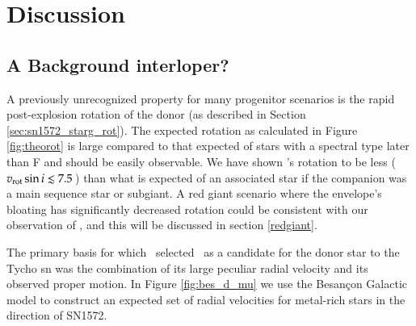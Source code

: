 \section{Discussion}


\subsection{A Background interloper?}
\label{sec:sn1572:interloper}
A previously unrecognized property for many progenitor scenarios is the rapid post-explosion rotation of the donor (as described in Section \ref{sec:sn1572_starg_rot}).
The expected rotation as calculated in Figure \ref{fig:theorot} is
large compared to that expected of stars with a spectral type later
than F and should be easily observable. We have shown \starg's rotation to be less ($v_{\rm rot} \sin{i} \lesssim 7.5 $\,\kms) than what is expected  of an associated star if the companion was a main sequence star or subgiant. A red giant scenario where the envelope's bloating has significantly decreased rotation could be consistent with our observation of \starg, and this will be discussed in section \ref{redgiant}.

The primary basis for which \rl\ selected \starg\ as a candidate for
the donor star to the Tycho \gls{sn} was the combination of its large peculiar radial velocity
and its observed proper motion. In Figure \ref{fig:bes_d_mu} we
use the Besan\c{c}on Galactic model \citep{2003A&A...409..523R} to
construct an expected set of radial velocities for metal-rich stars in the
direction of SN1572.

